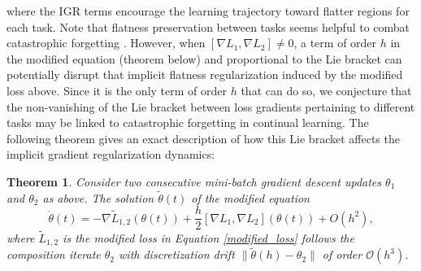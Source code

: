 \documentclass{article}
\newtheorem{theorem}{Theorem}[section]
\begin{document}
where the IGR terms encourage the learning trajectory toward flatter regions for each task. Note that flatness preservation between tasks seems helpful to combat catastrophic forgetting \cite{sanket2023pretraining_in_lifelong_learning,shi2023create}. However, when $[\nabla L_1, \nabla L_2]\neq 0$, a term of order $h$   in the modified equation (theorem below) and proportional to the Lie bracket can potentially disrupt that implicit flatness regularization induced by the modified loss above.  Since it is the only term of order $h$  that can do so, we conjecture that the non-vanishing of the Lie bracket between loss gradients pertaining to  different tasks may be linked to catastrophic forgetting in continual learning. The following theorem gives an exact description of how this Lie bracket affects the implicit gradient regularization dynamics:

\begin{theorem}
Consider two consecutive mini-batch gradient descent updates $\theta_1$ and $\theta_2$ as above. The solution $\tilde \theta(t)$ of the modified equation 
\begin{equation}\label{modified_equation}
   \dot \theta (t) = - \nabla  \widetilde L_{1,2}(\theta(t)) + \frac h2 [\nabla L_1, \nabla L_2](\theta(t)) + O(h^2),
\end{equation}
where $ \widetilde L_{1,2}$ is the modified loss in Equation \eqref{modified_loss} follows the composition iterate $\theta_2$ with discretization drift $\|\tilde \theta(h) - \theta_2\|$ of order $\mathcal O(h^3)$.
\end{theorem}
\end{document}
